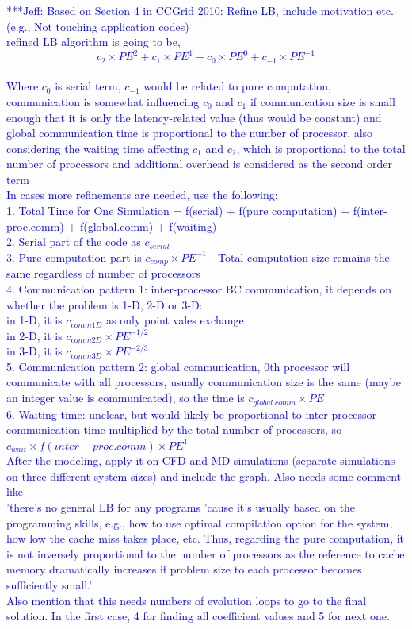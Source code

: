 \documentclass[conference,final]{IEEEtran}
\newcommand{\skonote}[1]{ {\textcolor{blue} { ***Jeff: #1 }}}
\newcommand{\skonote}[1]{}
\begin{document}
\skonote{Based on Section 4 in CCGrid 2010: Refine LB, include motivation etc. (e.g., Not touching application codes)\\
refined LB algorithm is going to be,\\
\begin{equation}
c_{2} \times PE^{2} + c_{1} \times PE^{1} + c_{0} \times PE^{0} + c_{-1} \times PE^{-1}
\end{equation} \\
Where $c_{0}$ is serial term, $c_{-1}$ would be related to pure computation, communication is somewhat influencing $c_{0}$ and $c_{1}$ if communication size is small enough that it is only the latency-related value (thus would be constant) and global communication time is proportional to the number of processor, also considering the waiting time affecting $c_{1}$ and $c_{2}$, which is proportional to the total number of processors and additional overhead is considered as the second order term\\
In cases more refinements are needed, use the following:\\
1. Total Time for One Simulation = f(serial) + f(pure computation) + f(inter-proc.comm) + f(global.comm) + f(waiting)\\
2. Serial part of the code as $c_{serial}$\\
3. Pure computation part is $c_{comp} \times PE^{-1}$ - Total computation size remains the same regardless of number of processors\\
4. Communication pattern 1: inter-processor BC communication, it depends on whether the problem is 1-D, 2-D or 3-D: \\
in 1-D, it is $c_{comm1D}$ as only point vales exchange\\
in 2-D, it is $c_{comm2D} \times PE^{-1/2}$\\
in 3-D, it is $c_{comm3D} \times PE^{-2/3}$\\
5. Communication pattern 2: global communication, 0th processor will communicate with all processors, usually communication size is the same (maybe an integer value is communicated), so the time is $c_{global.comm} \times PE^{1}$ \\
6. Waiting time: unclear, but would likely be proportional to inter-processor communication time multiplied by the total number of processors, so\\
$c_{wait} \times f(inter-proc.comm) \times PE^{1}$ \\
\newline
After the modeling, apply it on CFD and MD simulations (separate simulations on three different system sizes) and include the graph. Also needs some comment like \\
'there's no general LB for any programs 'cause it's usually based on the programming skills, e.g., how to use optimal compilation option for the system, how low the cache miss takes place, etc. Thus, regarding the pure computation, it is not inversely proportional to the number of processors as the reference to cache memory dramatically increases if problem size to each processor becomes sufficiently small.'\\
Also mention that this needs numbers of evolution loops to go to the final solution. In the first case, 4 for finding all coefficient values and 5 for next one.}
\end{document}

